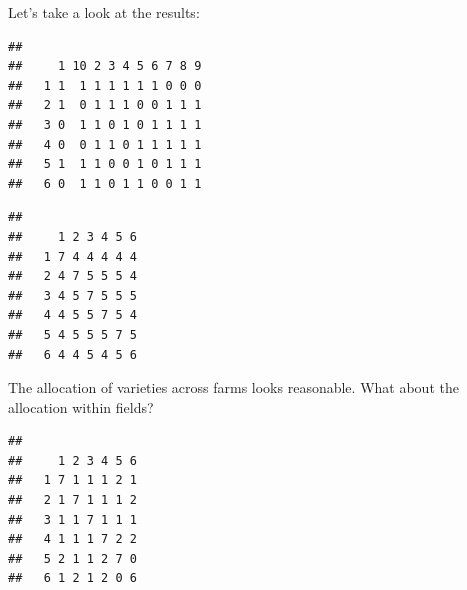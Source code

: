 \documentclass[
]{book}
\newenvironment{Shaded}{\begin{snugshade}}{\end{snugshade}}
\newcommand{\FunctionTok}[1]{\textcolor[rgb]{0.00,0.00,0.00}{#1}}
\newcommand{\NormalTok}[1]{#1}
\newcommand{\SpecialCharTok}[1]{\textcolor[rgb]{0.00,0.00,0.00}{#1}}
\begin{document}
Let's take a look at the results:

\begin{Shaded}
\end{Shaded}

\begin{verbatim}
##    
##     1 10 2 3 4 5 6 7 8 9
##   1 1  1 1 1 1 1 1 0 0 0
##   2 1  0 1 1 1 0 0 1 1 1
##   3 0  1 1 0 1 0 1 1 1 1
##   4 0  0 1 1 0 1 1 1 1 1
##   5 1  1 1 0 0 1 0 1 1 1
##   6 0  1 1 0 1 1 0 0 1 1
\end{verbatim}

\begin{Shaded}
\end{Shaded}

\begin{verbatim}
##    
##     1 2 3 4 5 6
##   1 7 4 4 4 4 4
##   2 4 7 5 5 5 4
##   3 4 5 7 5 5 5
##   4 4 5 5 7 5 4
##   5 4 5 5 5 7 5
##   6 4 4 5 4 5 6
\end{verbatim}

The allocation of varieties across farms looks reasonable. What about the allocation within fields?

\begin{Shaded}
\end{Shaded}

\begin{verbatim}
##    
##     1 2 3 4 5 6
##   1 7 1 1 1 2 1
##   2 1 7 1 1 1 2
##   3 1 1 7 1 1 1
##   4 1 1 1 7 2 2
##   5 2 1 1 2 7 0
##   6 1 2 1 2 0 6
\end{verbatim}
\end{document}
